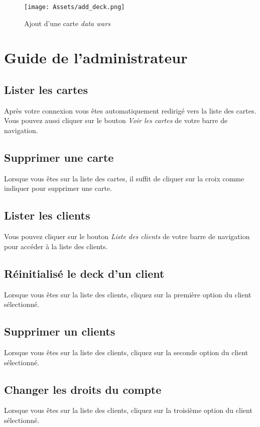 \documentclass[a4paper,11pt]{report}
\begin{document}
	\begin{figure}[th]
		\begin{center}
		\texttt{[image: Assets/add\_deck.png]}
      		\caption{Ajout d'une carte \textit{data wars}}
      		\label{fig2}
     		\end{center}
	\end{figure}

\chapter{Guide de l'administrateur}

	\section{Lister les cartes}
	Après votre connexion vous êtes automatiquement redirigé vers la liste des cartes. Vous pouvez aussi cliquer sur le bouton \textit{Voir les cartes} de votre barre de navigation.

	\section{Supprimer une carte}
	Lorsque vous êtes sur la liste des cartes, il suffit de cliquer sur la croix comme indiquer pour supprimer une carte.


	\section{Lister les clients}
	Vous pouvez cliquer sur le bouton \textit{Liste des clients} de votre barre de navigation pour accéder à la liste des clients.

	\section{Réinitialisé le deck d'un client}
	Lorsque vous êtes sur la liste des clients, cliquez sur la première option du client sélectionné.

	\section{Supprimer un clients}
	Lorsque vous êtes sur la liste des clients, cliquez sur la seconde option du client sélectionné.

	\section{Changer les droits du compte}
	Lorsque vous êtes sur la liste des clients, cliquez sur la troisième option du client sélectionné.
\end{document}
